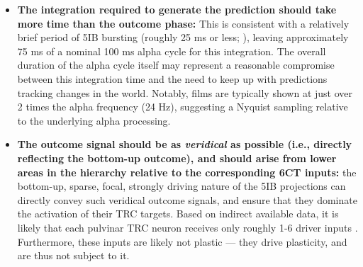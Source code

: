 \documentclass[11pt,twoside]{article}
\newif\myifpdf
\begin{document}
\begin{itemize}
		\item {\bf The integration required to generate the prediction should take more time than the outcome phase:}  This is consistent with a relatively brief period of 5IB bursting (roughly 25 ms or less; \citealp{ConnorsGutnickPrince82}), leaving approximately 75 ms of a nominal 100 ms alpha cycle for this integration.  The overall duration of the alpha cycle itself may represent a reasonable compromise between this integration time and the need to keep up with predictions tracking changes in the world.  Notably, films are typically shown at just over 2 times the alpha frequency (24 Hz), suggesting a Nyquist sampling relative to the underlying alpha processing.

	\item {\bf The outcome signal should be as \emph{veridical} as possible (i.e., directly reflecting the bottom-up outcome), and should arise from lower areas in the hierarchy relative to the corresponding 6CT inputs:} the bottom-up, sparse, focal, strongly driving nature of the 5IB projections can directly convey such veridical outcome signals, and ensure that they dominate the activation of their TRC targets.  Based on indirect available data, it is likely that each pulvinar TRC neuron receives only roughly 1-6 driver inputs \citep{ShermanGuillery06,ShermanGuillery11}.  Furthermore, these inputs are likely not plastic \citep{UsreySherman18} --- they drive plasticity, and are thus not subject to it.


\end{itemize}
\end{document}
